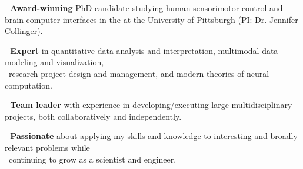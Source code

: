 \vspace*{-0.5cm}

\begin{cvparagraph}
- \textbf{Award-winning} PhD candidate studying human sensorimotor control and brain-computer interfaces in the  at the University of Pittsburgh (PI: Dr. Jennifer Collinger). 

- \textbf{Expert} in quantitative data analysis and interpretation, multimodal data modeling and visualization, \\\ research project design and management, and modern theories of neural computation.

- \textbf{Team leader} with experience in developing/executing large multidisciplinary projects, both collaboratively and independently.

- \textbf{Passionate} about applying my skills and knowledge to interesting and broadly relevant problems while \\\ continuing to grow as a scientist and engineer.
\vspace*{-0.6cm}
\end{cvparagraph}
